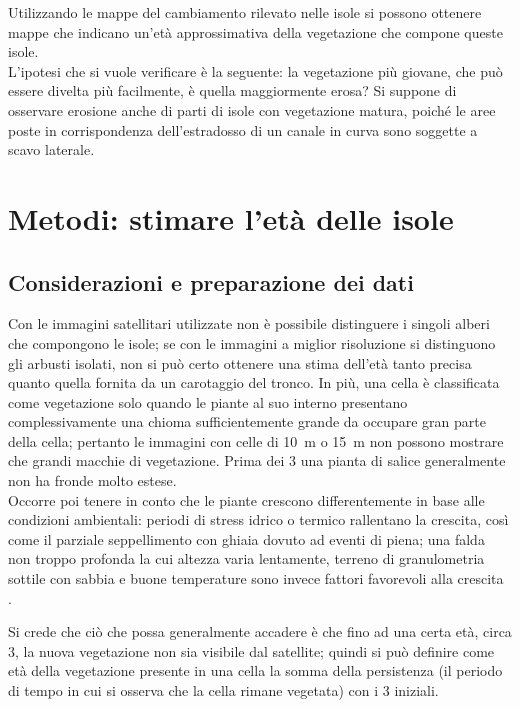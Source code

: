 Utilizzando le mappe del cambiamento rilevato nelle isole si possono ottenere mappe che indicano un'età approssimativa della vegetazione che compone queste isole. 
\\
L'ipotesi che si vuole verificare è la seguente: la vegetazione più giovane, che può essere divelta più facilmente, è quella maggiormente erosa?
Si suppone di osservare erosione anche di parti di isole con vegetazione matura, poiché le aree poste in corrispondenza dell'estradosso di un canale in curva sono soggette a scavo laterale.

\section{Metodi: stimare l'età delle isole}
\label{sec:eta}

\subsection{Considerazioni e preparazione dei dati}
Con le immagini satellitari utilizzate non è possibile distinguere i singoli alberi che compongono le isole; se con le immagini a miglior risoluzione si distinguono gli arbusti isolati, non si può certo ottenere una stima dell'età tanto precisa quanto quella fornita da un carotaggio del tronco.
In più, una cella è classificata come vegetazione solo quando le piante al suo interno presentano complessivamente una chioma sufficientemente grande da occupare gran parte della cella; pertanto le immagini con celle di \SI{10}{\m} o  \SI{15}{\m} non possono mostrare che grandi macchie di vegetazione.
Prima dei \SI{3}{\anni} una pianta di salice generalmente non ha fronde molto estese.
\\
Occorre poi tenere in conto che le piante crescono differentemente in base alle condizioni ambientali: periodi di stress idrico o termico rallentano la crescita, così come il parziale seppellimento con ghiaia dovuto ad eventi di piena; una falda non troppo profonda la cui altezza varia lentamente, terreno di granulometria sottile con sabbia e buone temperature sono invece fattori favorevoli alla crescita .

Si crede che ciò che possa generalmente accadere è che fino ad una certa età, circa \SI{3}{\anni}, la nuova vegetazione non sia visibile dal satellite; quindi si può definire come età della vegetazione presente in una cella la somma della persistenza (il periodo di tempo in cui si osserva che la cella rimane vegetata) con i \SI{3}{\anni} iniziali. 

